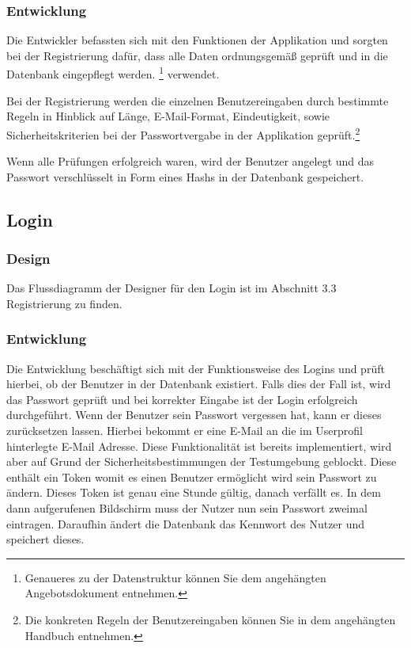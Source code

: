 \documentclass[12pt,a4paper]{article}
\begin{document}
\subsubsection*{Entwicklung}
Die Entwickler befassten sich mit den Funktionen der Applikation und sorgten bei der Registrierung dafür, dass alle Daten ordnungsgemäß geprüft und in die Datenbank eingepflegt werden.
\footnote{Genaueres zu der Datenstruktur können Sie dem angehängten Angebotsdokument entnehmen.} verwendet.

Bei der Registrierung werden die einzelnen Benutzereingaben durch bestimmte Regeln in Hinblick auf Länge, E-Mail-Format, Eindeutigkeit, sowie Sicherheitskriterien bei der Passwortvergabe in der Applikation geprüft.\footnote{Die konkreten Regeln der Benutzereingaben können Sie in dem angehängten Handbuch entnehmen.}

Wenn alle Prüfungen erfolgreich waren, wird der Benutzer angelegt und das Passwort verschlüsselt in Form eines Hashs in der Datenbank gespeichert.
\newpage
\subsection{Login}
\subsubsection*{Design}
Das Flussdiagramm der Designer für den Login ist im Abschnitt 3.3 Registrierung zu finden. 
\subsubsection*{Entwicklung}
Die Entwicklung beschäftigt sich mit der Funktionsweise des Logins und prüft hierbei, ob der Benutzer in der Datenbank existiert. Falls dies der Fall ist, wird das Passwort geprüft und bei korrekter Eingabe ist der Login erfolgreich durchgeführt.
Wenn der Benutzer sein Passwort vergessen hat, kann er dieses zurücksetzen lassen. Hierbei bekommt er eine E-Mail an die im Userprofil hinterlegte E-Mail Adresse. Diese Funktionalität ist bereits implementiert, wird aber auf Grund der Sicherheitsbestimmungen der Testumgebung geblockt. Diese enthält ein Token womit es einen Benutzer ermöglicht wird sein Passwort zu ändern. Dieses Token ist genau eine Stunde gültig, danach verfällt es. 
In dem dann aufgerufenen Bildschirm muss der Nutzer nun sein Passwort zweimal eintragen. Daraufhin ändert die Datenbank das Kennwort des Nutzer und speichert dieses.
\newpage
\end{document}
